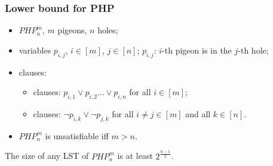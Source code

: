 \begin{frame}
    \frametitle{Lower bound for PHP}

    \begin{itemize}
		\item $PHP^m_n$, $m$ pigeons, $n$ holes;
		\item variables $p_{i, j}$, $i \in [m]$, $j \in [n]$; 
			$p_{i, j}$: $i$-th pigeon is in the $j$-th hole;
		\item clauses:
			\begin{itemize}
				\item {} clauses: $p_{i, 1} \lor p_{i, 2} \dots \lor p_{i, n}$ for all $i \in [m]$;
				\item {} clauses: $\lnot p_{i, k} \lor \lnot p_{j, k}$ for all $i \neq j \in [m]$ and all $k
					\in [n]$.
			\end{itemize}
		\item $PHP^m_n$ is unsatisfiable iff $m > n$.
	\end{itemize}
    
	\pause

    \begin{theorem}
        The size of any LST of $PHP^m_n$ is at least $2^{\frac{n - 1}{2}}$.
    \end{theorem}

\end{frame}


